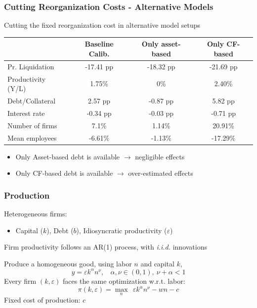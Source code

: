 \documentclass[aspectratio=169,xcolor=table]{beamer}
\begin{document}
\begin{frame}[label=Aggeffects] \frametitle{Cutting Reorganization Costs - Alternative Models \hfill  \hyperlink{effects}{}}

Cutting the fixed reorganization cost in alternative model setups

\footnotesize
\begin{table}[H]
    \centering
    \renewcommand{\arraystretch}{0.85}
    \begin{tabular}{lccc}
    & \textbf{Baseline Calib.} & \textbf{Only asset-based} & \textbf{Only CF-based} \\    
    \toprule
    \rowcolor{blue!10} Pr. Liquidation & -17.41 pp & -18.32 pp & -21.69 pp \\  
    \rowcolor{blue!10} Productivity (Y/L) & 1.75\% & 0\% & 2.40\% \vspace{2mm} \\  

    Debt/Collateral & 2.57 pp & -0.87 pp & 5.82 pp \\  
    Interest rate & -0.34 pp & -0.03 pp & -0.71 pp \\  
    Number of firms & 7.1\% & 1.14\% & 20.91\% \\  
    Mean employees & -6.61\% & -1.13\% & -17.29\% \\  
    \bottomrule
    \end{tabular}
    \label{tab:percentage_changes}
\end{table}
\normalsize

\small
\begin{itemize} 
    \item Only Asset-based debt is available $\rightarrow$ negligible effects
    \item Only CF-based debt is available $\rightarrow$ over-estimated effects
\end{itemize} 


\end{frame}





\begin{frame}[label=Firms] \frametitle{Production}

Heterogeneous firms: 
\begin{itemize} \small
    \item Capital ($k$), Debt ($b$), Idiosyncratic productivity ($\varepsilon$)
\end{itemize} 
Firm productivity follows an AR(1) process, with \textit{i.i.d.} innovations \normalsize \vspace{3mm}

Produce a homogeneous good, using labor $n$ and capital $k$,
$$ y = \varepsilon k^{\alpha}n^{\nu}, \ \ \ \ \alpha,\nu \in (0,1),  \ \nu + \alpha < 1 $$
Every firm $(k,\varepsilon)$ faces the same optimization w.r.t. labor:
$$ \pi(k,\varepsilon) = \max_{n} \ \  \varepsilon k^{\alpha}n^{\nu} - wn - c$$ 
Fixed cost of production: $c$

\end{frame}
\end{document}
